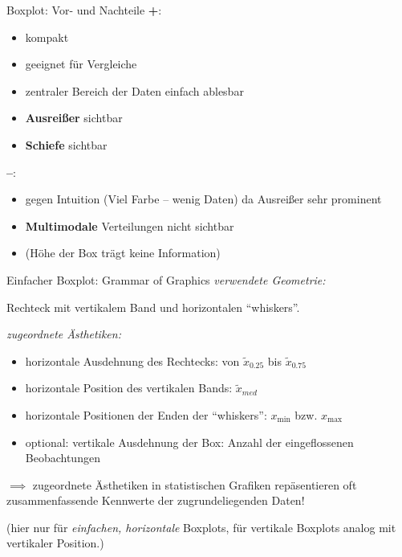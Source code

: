 \documentclass[
  10pt,
  ignorenonframetext,
]{beamer}
\providecommand{\tightlist}{%
  \setlength{\itemsep}{0pt}\setlength{\parskip}{0pt}}
\begin{document}
\begin{frame}{Boxplot: Vor- und Nachteile}
\label{boxplot-vor--und-nachteile}
\textbf{+}:

\begin{itemize}
\tightlist
\item
  kompakt
\item
  geeignet für Vergleiche
\item
  zentraler Bereich der Daten einfach ablesbar
\item
  \textbf{Ausreißer} sichtbar
\item
  \textbf{Schiefe} sichtbar
\end{itemize}

\textbf{--}:

\begin{itemize}
\tightlist
\item
  gegen Intuition (Viel Farbe -- wenig Daten) da Ausreißer sehr
  prominent
\item
  \textbf{Multimodale} Verteilungen nicht sichtbar
\item
  (Höhe der Box trägt keine Information)
\end{itemize}
\end{frame}

\begin{frame}{Einfacher Boxplot: Grammar of Graphics}
\label{einfacher-boxplot-grammar-of-graphics}
\emph{verwendete Geometrie:}

Rechteck mit vertikalem Band und horizontalen ``whiskers''.

\emph{zugeordnete Ästhetiken:}

\begin{itemize}
\tightlist
\item
  horizontale Ausdehnung des Rechtecks: von \(\tilde x_{0.25}\) bis
  \(\tilde x_{0.75}\)
\item
  horizontale Position des vertikalen Bands: \(\tilde x_{med}\)
\item
  horizontale Positionen der Enden der ``whiskers'': \(x_{\min}\) bzw.
  \(x_{\max}\)
\item
  optional: vertikale Ausdehnung der Box: Anzahl der eingeflossenen
  Beobachtungen
\end{itemize}

\(\implies\) zugeordnete Ästhetiken in statistischen Grafiken
repäsentieren oft zusammenfassende Kennwerte der zugrundeliegenden
Daten!

\scriptsize (hier nur für \textit{einfachen, horizontale} Boxplots, für
vertikale Boxplots analog mit vertikaler Position.)
\end{frame}
\end{document}
